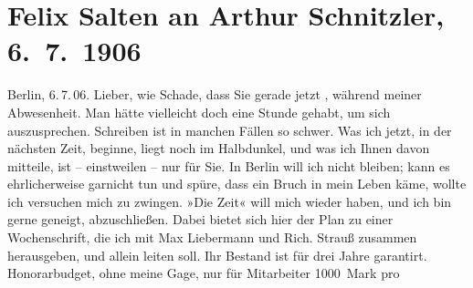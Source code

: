                \section[Felix Salten an Arthur Schnitzler, 6. 7. 1906]{ Felix Salten an Arthur Schnitzler, 6. 7. 1906}\nopagebreak{}\rehead{ }\begin{ledgroupsized}[t]{13cm}\normalsize\beginnumbering \toendnotes[C]{\smallbreak\pagebreak[2]} 
\toendnotes[C]{\smallbreak}\pstart
           \raggedleft{}{\pb}Berlin, 6. 7. 06. \pend
           \pstart
           Lieber, wie Schade, dass Sie gerade jetzt \label{K_L03430-1v}\label{K_L03430-1h}, während meiner Abwesenheit. Man hätte vielleicht doch eine Stunde gehabt, um
               sich auszusprechen. Schreiben ist in manchen Fällen so schwer. Was ich jetzt, in der
               nächsten Zeit, beginne, liegt noch im Halbdunkel, und was ich Ihnen davon mitteile,
               ist – einstweilen – nur für Sie. In Berlin will
               ich nicht bleiben; kann es ehrlicherweise garnicht tun und spüre, dass ein Bruch in
               mein Leben käme, wollte ich versuchen mich zu zwingen. »Die Zeit« will mich wieder haben, und ich bin gerne geneigt,
               abzuschließen. Dabei bietet sich hier der Plan zu einer Wochenschrift, die ich mit Max Liebermann und Rich.
                  Strauß zusammen herausgeben, und allein leiten soll. Ihr Bestand ist für drei
               Jahre garantirt. Honorarbudget, ohne meine Gage, nur für Mitarbeiter 1000 Mark pro

\end{ledgroupsized}
